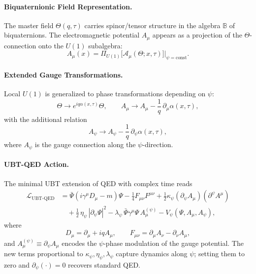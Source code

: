 \paragraph{Biquaternionic Field Representation.} The master field $\Theta(q,\tau)$ carries spinor/tensor structure in the algebra $\mathbb{B}$ of biquaternions. The electromagnetic potential $A_\mu$ appears as a projection of the $\Theta$-connection onto the $U(1)$ subalgebra:
\begin{equation}
A_\mu(x) = \Pi_{U(1)}\!\big[\mathcal{A}_\mu(\Theta; x,\tau)\big] \Big|_{\psi=\mathrm{const}} .
\end{equation}

\paragraph{Extended Gauge Transformations.} Local $U(1)$ is generalized to phase transformations depending on $\psi$:
\begin{equation}
\Theta \to e^{i q \alpha(x,\tau)} \Theta, \qquad
A_\mu \to A_\mu - \frac{1}{q}\,\partial_\mu \alpha(x,\tau) ,
\end{equation}
with the additional relation
\begin{equation}
A_\psi \to A_\psi - \frac{1}{q}\,\partial_\psi \alpha(x,\tau),
\end{equation}
where $A_\psi$ is the gauge connection along the $\psi$-direction.

\paragraph{UBT-QED Action.} The minimal UBT extension of QED with complex time reads
\begin{align}
\mathcal{L}_{\mathrm{UBT\text{-}QED}} &= \bar{\Psi}\!\left(i\gamma^\mu D_\mu - m\right)\!\Psi
- \frac{1}{4} F_{\mu\nu}F^{\mu\nu}
+ \frac{1}{2} \kappa_\psi (\partial_\psi A_\mu)(\partial^\psi A^\mu) \nonumber\\
&\quad + \frac{1}{2}\,\eta_\psi\, |\partial_\psi \Psi|^2
- \lambda_\psi\, \bar{\Psi}\gamma^\mu \Psi\, A_\mu^{(\psi)}
- V_\psi(\Psi, A_\mu, A_\psi) ,
\end{align}
where
\begin{equation}
D_\mu = \partial_\mu + i q A_\mu, \qquad
F_{\mu\nu} = \partial_\mu A_\nu - \partial_\nu A_\mu ,
\end{equation}
and $A_\mu^{(\psi)} \equiv \partial_\psi A_\mu$ encodes the $\psi$-phase modulation of the gauge potential. The new terms proportional to $\kappa_\psi,\eta_\psi,\lambda_\psi$ capture dynamics along $\psi$; setting them to zero and $\partial_\psi(\cdot)=0$ recovers standard QED.

